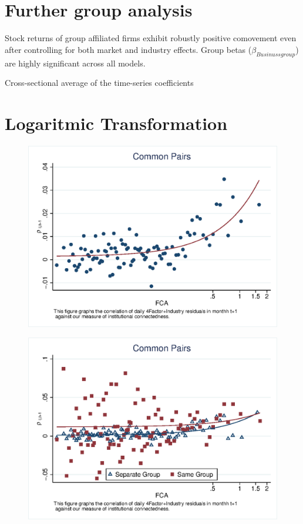 \documentclass[12pt, a4paper]{article}
\begin{document}
\begin{appendices}
\section{Further group analysis}
Stock returns of group affiliated firms exhibit robustly positive comovement even after controlling for both market and industry effects. Group betas
($ \beta_{Businussgroup} $) are highly significant across all models.

\begin{table}[htbp]
	\centering
	\caption{Cross-sectional average of the time-series coefficients}
	\resizebox{\textwidth}{!}{
		
	}
\end{table}

\FloatBarrier


\section{Logaritmic Transformation}



 \begin{figure}
 \centering  
\includegraphics[width=0.8\linewidth]{"mcorr50.eps"}
\end{figure}

  \begin{figure}   
 \centering
\includegraphics[width=0.8\linewidth]{"mcorr50bg.eps"}     \end{figure}            



\end{appendices}
\end{document}
